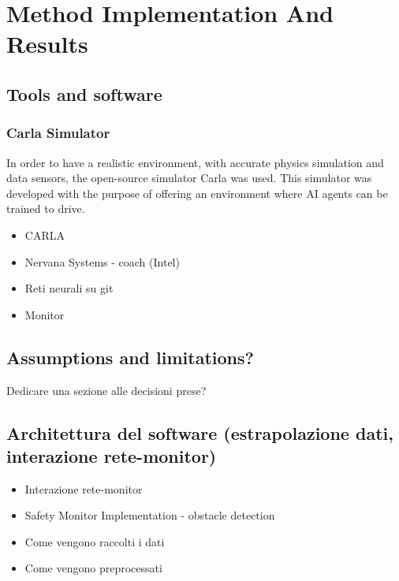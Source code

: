 \chapter{Method Implementation And Results}

\section{Tools and software}

\subsection{Carla Simulator}

In order to have a realistic environment, with accurate physics simulation and data sensors, the open-source simulator Carla was used. This simulator was developed with the purpose of offering an environment where AI agents can be trained to drive.\newline

\begin{itemize}
	\item CARLA
	\item Nervana Systems - coach (Intel)
	\item Reti neurali su git
	\item Monitor
\end{itemize}


\section{Assumptions and limitations?}

Dedicare una sezione alle decisioni prese?

\section{Architettura del software (estrapolazione dati, interazione rete-monitor)}

\begin{itemize}
	
	\item Interazione rete-monitor
	\item Safety Monitor Implementation - obstacle detection
	\item Come vengono raccolti i dati
	\item Come vengono preprocessati
	
\end{itemize}

